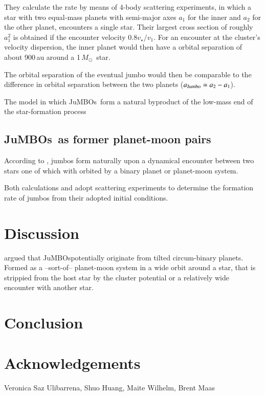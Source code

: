 \documentclass[aa]{lib/aa}
\newcommand{\MSun}{\mbox{${M}_\odot$}}
\newcommand{\jumbos}{\mbox{JuMBOs}}
\begin{document}
They calculate the rate by means of 4-body scattering experiments, in
which a star with two equal-mass planets with semi-major axes $a_1$
for the inner and $a_2$ for the other planet, encounters a single
star. Their largest cross section of roughly $a_1^2$ is obtained if
the encounter velocity $0.8v_\star/v_1$. For an encounter at the
cluster's velocity dispersion, the inner planet would then have a
orbital separation of about 900\,au around a 1\,\MSun\, star.

The orbital separation of the eventual jumbo would then be comparable
to the difference in orbital separation between the two planets
($a_{\rm Jumbo} \simeq a_2-a_1$).

The model in which \jumbos\, form a natural byproduct of the low-mass
end of the star-formation process




\subsection{\jumbos\, as former planet-moon pairs}

According to \cite{2023arXiv231015603C}, jumbos form naturally upon a
dynamical encounter between two stars one of which with orbited by a
binary planet or planet-moon system.

Both calculations \cite{2023arXiv231006016W} and
\cite{2023arXiv231015603C} adopt scattering experiments to determine
the formation rate of jumbos from their adopted initial conditions.


\section{Discussion}

\cite{2023arXiv231015603C} argued that \jumbos potentially originate
from tilted circum-binary planets. Formed as a --sort-of-- planet-moon
system in a wide orbit around a star, that is strippied from the host
star by the cluster potential or a relatively wide encounter with
another star. 



\section{Conclusion}

\section*{Acknowledgements}

Veronica Saz Ulibarrena, Shuo Huang, Maite Wilhelm, Brent Maas
    

    
\end{document}
